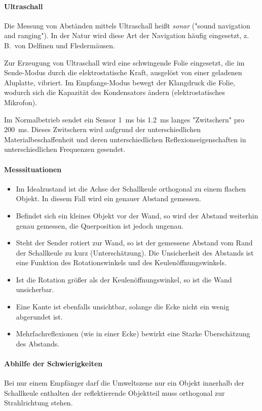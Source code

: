 \documentclass[a4paper, 11pt, accentcolor = tud3b]{tudreport}
\newcommand{\zB}{z.\,B.~}
\begin{document}
					\paragraph{Ultraschall}
						Die Messung von Abständen mittels Ultraschall heißt \emph{sonar} ("sound navigation and ranging"). In der Natur wird diese Art der Navigation häufig eingesetzt, \zB von Delfinen und Fledermäusen.
						
						Zur Erzeugung von Ultraschall wird eine schwingende Folie eingesetzt, die im Sende-Modus durch die elektrostatische Kraft, ausgelöst von einer geladenen Aluplatte, vibriert. Im Empfangs-Modus bewegt der Klangdruck die Folie, wodurch sich die Kapazität des Kondensators ändern (elektrostatisches Mikrofon).
						
						Im Normalbetrieb sendet ein Sensor \SI{1}{\milli\second} bis \SI{1.2}{\milli\second} langes "Zwitschern" pro \SI{200}{\milli\second}. Dieses Zwitschern wird aufgrund der unterschiedlichen Materialbeschaffenheit und deren unterschiedlichen Reflexionseigenschaften in unterschiedlichen Frequenzen gesendet.

					\paragraph{Messsituationen}
						\begin{itemize}
							\item Im Idealzustand ist die Achse der Schallkeule orthogonal zu einem flachen Objekt. In diesem Fall wird ein genauer Abstand gemessen.
							\item Befindet sich ein kleines Objekt vor der Wand, so wird der Abstand weiterhin genau gemessen, die Querposition ist jedoch ungenau.
							\item Steht der Sender rotiert zur Wand, so ist der gemessene Abstand vom Rand der Schallkeule zu kurz (Unterschätzung). Die Unsicherheit des Abstands ist eine Funktion des Rotationswinkels und des Keulenöffnungswinkels.
							\item Ist die Rotation größer als der Keulenöffnungswinkel, so ist die Wand unsicherbar.
							\item Eine Kante ist ebenfalls unsichtbar, solange die Ecke nicht ein wenig abgerundet ist.
							\item Mehrfachreflexionen (wie in einer Ecke) bewirkt eine Starke Überschätzung des Abstands.
						\end{itemize}

					\paragraph{Abhilfe der Schwierigkeiten}
						Bei nur einem Empfänger darf die Umweltszene nur ein Objekt innerhalb der Schallkeule enthalten der reflektierende Objektteil muss orthogonal zur Strahlrichtung stehen.
						
\end{document}
